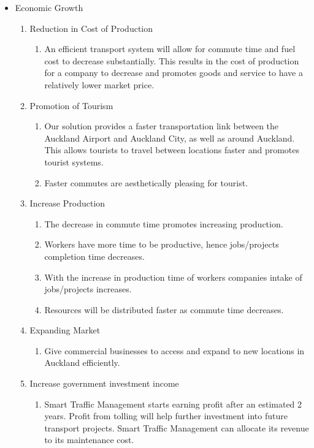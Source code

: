 \documentclass[twoside, a4paper, 11pt]{article}
\begin{document}
\begin{itemize}[leftmargin=0in]
\item Economic Growth \citep{econND}
\begin{enumerate}
\item Reduction in Cost of Production
\begin{enumerate}
\item An efficient transport system will allow for commute time and fuel cost to decrease substantially. This results in the cost of production for a company to decrease and promotes goods and service to have a relatively lower market price.
\end{enumerate}
\item Promotion of Tourism
\begin{enumerate}
\item Our solution provides a faster transportation link between the Auckland Airport and Auckland City, as well as around Auckland. This allows tourists to travel between locations faster and promotes tourist systems. 
\item Faster commutes are aesthetically pleasing for tourist.
\end{enumerate}
\item Increase Production 
\begin{enumerate}
\item The decrease in commute time promotes increasing production. 
\item Workers have more time to be productive, hence jobs/projects completion time decreases. 
\item With the increase in production time of workers companies intake of jobs/projects increases. 
\item Resources will be distributed faster as commute time decreases.
\end{enumerate}
\item Expanding Market
\begin{enumerate}
\item Give commercial businesses to access and expand to new locations in Auckland efficiently.
\end{enumerate}
\item Increase government investment income
\begin{enumerate}
\item Smart Traffic Management starts earning profit after an estimated 2 years. Profit from tolling will help further investment into future transport projects. Smart Traffic Management can allocate its revenue to its maintenance cost.

\end{enumerate}
\end{enumerate}
\end{itemize}
\end{document}
